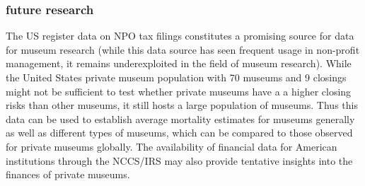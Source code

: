 \documentclass[12pt]{article}
\begin{document}
\subsubsection*{future research}

The US register data on NPO tax filings constitutes a promising source for data for museum research (while this data source has seen frequent usage in non-profit management, it remains underexploited in the field of museum research). 
While the United States private museum population with 70 museums and 9 closings might not be sufficient to test whether private museums have a a higher closing risks than other museums, it still hosts a large population of museums.
Thus this data can be used to establish average mortality estimates for museums generally as well as different types of museums, which can be compared to those observed for private museums globally. 
The availability of financial data for American institutions through the NCCS/IRS may also provide tentative insights into the finances of private museums. 




\begin{sloppypar}
\printbibliography
\end{sloppypar}
\end{document}
